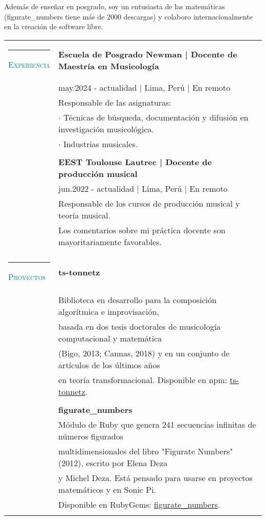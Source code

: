 \documentclass[letterpaper,10pt,oneside]{article}
\begin{document}
Además de enseñar en posgrado, soy un entusiasta de las matemáticas (figurate\_numbers tiene más de 2000 descargas) y colaboro internacionalmente en la creación de software libre.
\vspace{2em}

\noindent
\begin{tabular}{@{}l l}

  \textcolor{teal}{\rule{0.4em}{7pt}}
  \scshape{\textcolor{teal}{Experiencia}} & \textbf{Escuela de Posgrado Newman | Docente de Maestría en Musicología} \\
    &  may.2024 - actualidad | Lima, Perú | En remoto \\
    & Responsable de las asignaturas: \\
    & $\cdot$ Técnicas de búsqueda, documentación y difusión en investigación musicológica.  \\
    & $\cdot$ Industrias musicales. \\
    & \\
    &\textbf{EEST Toulouse Lautrec | Docente de producción musical}  \\
    & jun.2022 - actualidad | Lima, Perú | En remoto \\
    & Responsable de los cursos de producción musical y teoría musical. \\
    & Los comentarios sobre mi práctica docente son mayoritariamente favorables. \\
    & \\

    \textcolor{teal}{\rule{0.4em}{7pt}}
    \scshape{\textcolor{teal}{Proyectos}}
    & \textbf{ts-tonnetz} \\
    & Biblioteca en desarrollo para la composición algorítmica e improvisación, \\ & basada en dos tesis doctorales de musicología computacional y matemática \\ & (Bigo, 2013; Cannas, 2018) y en un conjunto de artículos  de los últimos años \\ & en teoría transformacional. Disponible en npm: \href{https://www.npmjs.com/package/ts-tonnetz }{{ts-tonnetz}}. \\

    & \\
    & \textbf{figurate\_numbers} \\
    & Módulo de Ruby que genera 241 secuencias infinitas  de números figurados \\ &multidimensionales del libro "Figurate Numbers" (2012), escrito por Elena Deza \\ &  y Michel Deza.  Está pensado para usarse en proyectos matemáticos y en Sonic Pi.  \\ & Disponible en RubyGems: \href{https://rubygems.org/gems/figurate_numbers }{figurate\_numbers}.\\
    & \\



\end{tabular}
\end{document}

